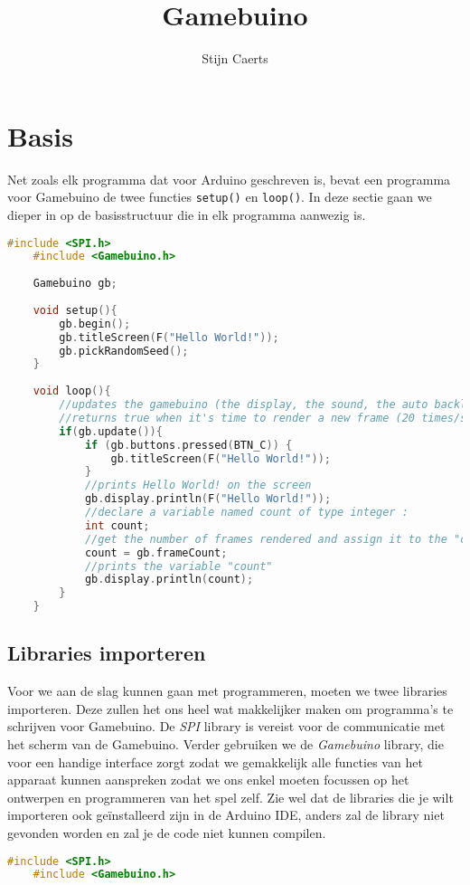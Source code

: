 \documentclass[a4paper,titlepage,12pt]{article}
\title{Gamebuino}
\author{Stijn Caerts}
\begin{document}
	\maketitle
	
	\tableofcontents
	\newpage
	
	\section{Basis}
	Net zoals elk programma dat voor Arduino geschreven is, bevat een programma voor Gamebuino de twee functies \texttt{setup()} en \texttt{loop()}. In deze sectie gaan we dieper in op de basisstructuur die in elk programma aanwezig is.
	
	\begin{lstlisting}[language=C++, caption=Structuur van een Gamebuino programma]
	#include <SPI.h>
	#include <Gamebuino.h>
	
	Gamebuino gb;
	
	void setup(){
		gb.begin();
		gb.titleScreen(F("Hello World!"));
		gb.pickRandomSeed();
	}
	
	void loop(){
		//updates the gamebuino (the display, the sound, the auto backlight... everything)
		//returns true when it's time to render a new frame (20 times/second)
		if(gb.update()){
			if (gb.buttons.pressed(BTN_C)) {
				gb.titleScreen(F("Hello World!"));
			}
			//prints Hello World! on the screen
			gb.display.println(F("Hello World!"));
			//declare a variable named count of type integer :
			int count;
			//get the number of frames rendered and assign it to the "count" variable
			count = gb.frameCount;
			//prints the variable "count"
			gb.display.println(count);
		}
	}
	\end{lstlisting}
	
	\subsection{Libraries importeren}
	Voor we aan de slag kunnen gaan met programmeren, moeten we twee libraries importeren. Deze zullen het ons heel wat makkelijker maken om programma's te schrijven voor Gamebuino. De \emph{SPI} library is vereist voor de communicatie met het scherm van de Gamebuino. Verder gebruiken we de \emph{Gamebuino} library, die voor een handige interface zorgt zodat we gemakkelijk alle functies van het apparaat kunnen aanspreken zodat we ons enkel moeten focussen op het ontwerpen en programmeren van het spel zelf.
	Zie wel dat de libraries die je wilt importeren ook geïnstalleerd zijn in de Arduino IDE, anders zal de library niet gevonden worden en zal je de code niet kunnen compilen.
	\begin{lstlisting}[language=C++, caption={Importeren van libraries}]
	#include <SPI.h>
	#include <Gamebuino.h>
	\end{lstlisting}
	
\end{document}
